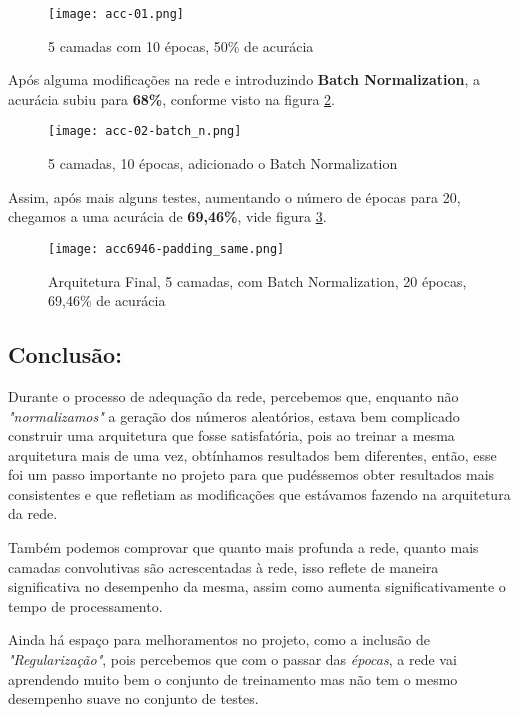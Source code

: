 \begin{figure}[ht]
\centering
\texttt{[image: acc-01.png]}
\caption{5 camadas com 10 épocas, 50\% de acurácia}\label{fig:acc10}
\end{figure}

Após alguma modificações na rede e introduzindo \textbf{Batch Normalization}, a acurácia subiu para
\textbf{68\%}, conforme visto na figura \ref{fig:acc68}.

\begin{figure}[ht]
\centering
\texttt{[image: acc-02-batch\_n.png]}
\caption{5 camadas, 10 épocas, adicionado o Batch Normalization}\label{fig:acc68}
\end{figure}

Assim, após mais alguns testes, aumentando o número de épocas para 20,
chegamos a uma acurácia de \textbf{69,46\%}, vide figura \ref{fig:acc69}.

\begin{figure}[H]
\centering
\texttt{[image: acc6946-padding\_same.png]}
\caption{Arquitetura Final, 5 camadas, com Batch Normalization, 20 épocas, 69,46\% de acurácia}\label{fig:acc69}
\end{figure}

    \subsection{Conclusão:}\label{conclusao}

Durante o processo de adequação da rede, percebemos que, enquanto não \emph{"normalizamos"}
a geração dos números aleatórios, estava bem complicado construir uma arquitetura
que fosse satisfatória, pois ao treinar a mesma arquitetura mais de uma vez, obtínhamos
resultados bem diferentes, então, esse foi um passo importante no projeto para que
pudéssemos obter resultados mais consistentes e que refletiam as modificações que
estávamos fazendo na arquitetura da rede.

Também podemos comprovar que quanto mais profunda a rede, quanto mais camadas convolutivas
são acrescentadas à rede, isso reflete de maneira significativa no desempenho da mesma,
assim como aumenta significativamente o tempo de processamento.

Ainda há espaço para melhoramentos no projeto, como a inclusão de \emph{"Regularização"}, pois
percebemos que com o passar das \emph{épocas}, a rede vai aprendendo muito bem o conjunto
de treinamento mas não tem o mesmo desempenho suave no conjunto de testes.


